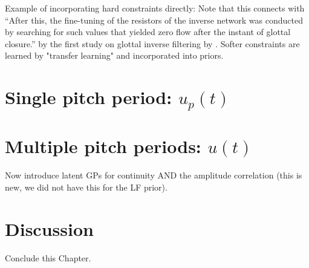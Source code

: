 \begin{chaptersections}
Example of incorporating hard constraints directly:
Note that this connects with ``After this, the fine-tuning of the resistors of the inverse network was conducted by searching for such values that yielded zero flow after the instant of glottal closure.'' \citep[p.~626]{Alku2011} by the first study on glottal inverse filtering by \citep{Miller1959}.
Softer constraints are learned by "transfer learning" and incorporated into priors.

\section{Single pitch period: $u_p(t)$}

\section{Multiple pitch periods: $u(t)$}

Now introduce latent GPs for continuity AND the amplitude correlation (this is new, we did not have this for the LF prior).

\section{Discussion}

Conclude this Chapter.


\end{chaptersections}
